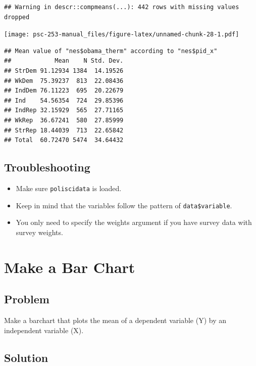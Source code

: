 \documentclass[
]{book}
\providecommand{\tightlist}{%
  \setlength{\itemsep}{0pt}\setlength{\parskip}{0pt}}
\begin{document}
\begin{verbatim}
## Warning in descr::compmeans(...): 442 rows with missing values dropped
\end{verbatim}

\texttt{[image: psc-253-manual\_files/figure-latex/unnamed-chunk-28-1.pdf]}

\begin{verbatim}
## Mean value of "nes$obama_therm" according to "nes$pid_x"
##            Mean    N Std. Dev.
## StrDem 91.12934 1384  14.19526
## WkDem  75.39237  813  22.08436
## IndDem 76.11223  695  20.22679
## Ind    54.56354  724  29.85396
## IndRep 32.15929  565  27.71165
## WkRep  36.67241  580  27.85999
## StrRep 18.44039  713  22.65842
## Total  60.72470 5474  34.64432
\end{verbatim}

\hypertarget{troubleshooting-10}{%
\subsection{Troubleshooting}\label{troubleshooting-10}}

\begin{itemize}
\tightlist
\item
  Make sure \texttt{poliscidata} is loaded.
\item
  Keep in mind that the variables follow the pattern of \texttt{data\$variable}.
\item
  You only need to specify the weights argument if you have survey data with survey weights.
\end{itemize}

\hypertarget{barchart}{%
\section{Make a Bar Chart}\label{barchart}}

\hypertarget{problem-13}{%
\subsection{Problem}\label{problem-13}}

Make a barchart that plots the mean of a dependent variable (Y) by an independent variable (X).

\hypertarget{solution-13}{%
\subsection{Solution}\label{solution-13}}
\end{document}
